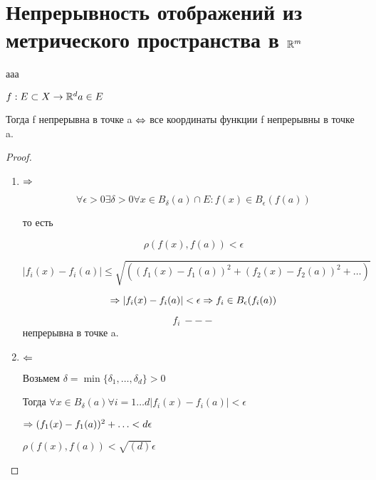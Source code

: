 ﻿\section{Непрерывность отображений из метрического пространства в $\mathbb{R}^m$}

\begin{theorem}{ааа}

 $f: E \subset X \to \mathbb{R}^{d} a \in E$

 Тогда f  непрерывна в точке a $\Leftrightarrow$ все координаты функции f непрерывны в точке a.
 
\end{theorem}

\begin{proof}
 \begin{enumerate}
 \item $\Rightarrow$

  $$\forall \epsilon > 0 \exists \delta > 0 \forall x \in B_{\delta}(a) \cap E: f(x) \in B_{\epsilon}(f(a)) $$

  то есть 

  $$\rho(f(x), f(a)) < \epsilon$$

  $$|f_i(x) - f_i(a)| \leqslant \sqrt{((f_1(x) - f_1(a))^2 + (f_2(x) - f_2(a))^2 + \ldots)}$$

  $$\Rightarrow |f_i(x) - f_i(a)| < \epsilon \Rightarrow f_i \in B_{\epsilon}(f_i(a)) $$

  $$f_i ~---$$ непрерывна в точке a.
 \item $\Leftarrow$
  
  Возьмем $\delta = \min\{\delta_1, \ldots, \delta_d\} > 0$

  Тогда $\forall x \in B_{\delta}(a) \forall i = 1 \ldots d |f_i(x) - f_i(a)| < \epsilon$

  $\Rightarrow (f_1(x) - f_1(a))^2 + \ldots < d \epsilon$

 $\rho(f(x), f(a)) < \sqrt{(d)} \epsilon$ 
 
 \end{enumerate}
\end{proof}